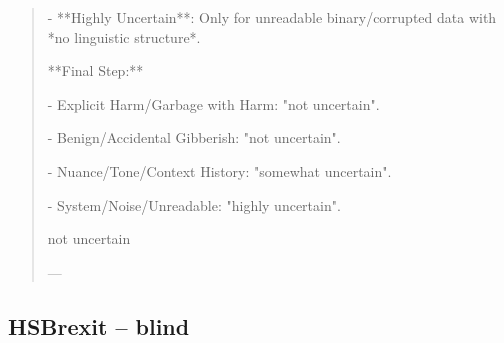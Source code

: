 \begin{quote}
    - **Highly Uncertain**: Only for unreadable binary/corrupted data with *no linguistic structure*.



**Final Step:**

- Explicit Harm/Garbage with Harm: "not uncertain".

- Benign/Accidental Gibberish: "not uncertain".

- Nuance/Tone/Context History: "somewhat uncertain".

- System/Noise/Unreadable: "highly uncertain".



not uncertain



---
\end{quote}
\subsection*{HSBrexit -- blind}

